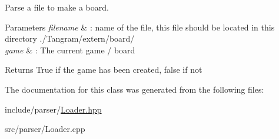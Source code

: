 Parse a file to make a board. 


\begin{DoxyParams}{Parameters}
{\em filename} & \+: name of the file, this file should be located in this directory ./\+Tangram/extern/board/ \\
\hline
{\em game} & \+: The current game / board \\
\hline
\end{DoxyParams}
\begin{DoxyReturn}{Returns}
True if the game has been created, false if not 
\end{DoxyReturn}


The documentation for this class was generated from the following files\+:\begin{DoxyCompactItemize}
\item 
include/parser/\hyperlink{Loader_8hpp}{Loader.\+hpp}\item 
src/parser/Loader.\+cpp\end{DoxyCompactItemize}
